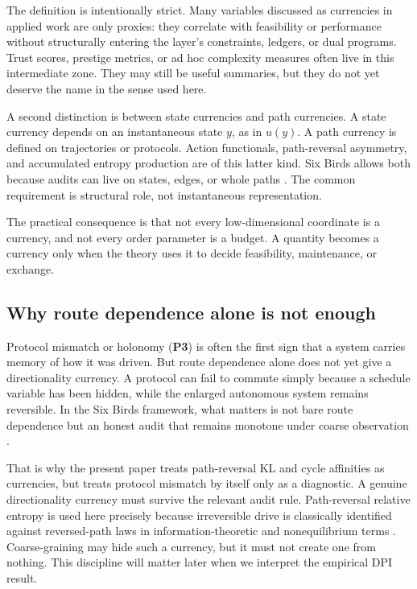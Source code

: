 \documentclass[11pt,a4paper]{article}
\begin{document}
The definition is intentionally strict. Many variables discussed as currencies in applied work are only proxies: they correlate with feasibility or performance without structurally entering the layer's constraints, ledgers, or dual programs. Trust scores, prestige metrics, or ad hoc complexity measures often live in this intermediate zone. They may still be useful summaries, but they do not yet deserve the name in the sense used here.

A second distinction is between state currencies and path currencies. A state currency depends on an instantaneous state \(y\), as in \(u(y)\). A path currency is defined on trajectories or protocols. Action functionals, path-reversal asymmetry, and accumulated entropy production are of this latter kind. Six Birds allows both because audits can live on states, edges, or whole paths \cite{tsiokos2026sixbirds}. The common requirement is structural role, not instantaneous representation.

The practical consequence is that not every low-dimensional coordinate is a currency, and not every order parameter is a budget. A quantity becomes a currency only when the theory uses it to decide feasibility, maintenance, or exchange.

\subsection{Why route dependence alone is not enough}

Protocol mismatch or holonomy (\textbf{P3}) is often the first sign that a system carries memory of how it was driven. But route dependence alone does not yet give a directionality currency. A protocol can fail to commute simply because a schedule variable has been hidden, while the enlarged autonomous system remains reversible. In the Six Birds framework, what matters is not bare route dependence but an honest audit that remains monotone under coarse observation \cite{tsiokos2026sixbirds}.

That is why the present paper treats path-reversal KL and cycle affinities as currencies, but treats protocol mismatch by itself only as a diagnostic. A genuine directionality currency must survive the relevant audit rule. Path-reversal relative entropy is used here precisely because irreversible drive is classically identified against reversed-path laws in information-theoretic and nonequilibrium terms \cite{kullback1951information,lebowitz1999gallavotti,seifert2005entropy}. Coarse-graining may hide such a currency, but it must not create one from nothing. This discipline will matter later when we interpret the empirical DPI result.
\end{document}
